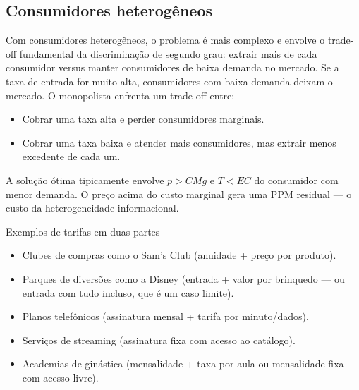 \documentclass[11pt,twoside,openright]{book}
\providecommand{\tightlist}{\setlength{\itemsep}{0pt}\setlength{\parskip}{0pt}}
\begin{document}
\subsection{Consumidores
heterogêneos}\label{consumidores-heteroguxeaneos}

Com consumidores heterogêneos, o problema é mais complexo e envolve o
trade-off fundamental da discriminação de segundo grau: extrair mais de
cada consumidor versus manter consumidores de baixa demanda no mercado.
Se a taxa de entrada for muito alta, consumidores com baixa demanda
deixam o mercado. O monopolista enfrenta um trade-off entre:

\begin{itemize}
\tightlist
\item
  Cobrar uma taxa alta e perder consumidores marginais.
\item
  Cobrar uma taxa baixa e atender mais consumidores, mas extrair menos
  excedente de cada um.
\end{itemize}

A solução ótima tipicamente envolve \(p > CMg\) e \(T < EC\) do
consumidor com menor demanda. O preço acima do custo marginal gera uma
PPM residual --- o custo da heterogeneidade informacional.

\begin{tipbox}{Exemplos de tarifas em duas partes}

\begin{itemize}
\tightlist
\item
  Clubes de compras como o Sam's Club (anuidade + preço por produto).
\item
  Parques de diversões como a Disney (entrada + valor por brinquedo ---
  ou entrada com tudo incluso, que é um caso limite).
\item
  Planos telefônicos (assinatura mensal + tarifa por minuto/dados).
\item
  Serviços de streaming (assinatura fixa com acesso ao catálogo).
\item
  Academias de ginástica (mensalidade + taxa por aula ou mensalidade
  fixa com acesso livre).
\end{itemize}

\end{tipbox}
\end{document}
